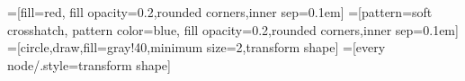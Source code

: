 
\usetikzlibrary{arrows,patterns}

%
{
  \pgfsetlinewidth{0.4pt}
  \pgfpathmoveto{\pgfqpoint{3.1pt}{0pt}}
  \pgfpathlineto{\pgfqpoint{0pt}{3.1pt}}
  \pgfpathmoveto{\pgfqpoint{0pt}{0pt}}
  \pgfpathlineto{\pgfqpoint{3.1pt}{3.1pt}}
}

=[fill=red, fill opacity=0.2,rounded corners,inner sep=0.1em]
=[pattern=soft crosshatch, pattern color=blue, fill opacity=0.2,rounded corners,inner sep=0.1em]
=[circle,draw,fill=gray!40,minimum size=2,transform shape]
=[every node/.style={transform shape}]

